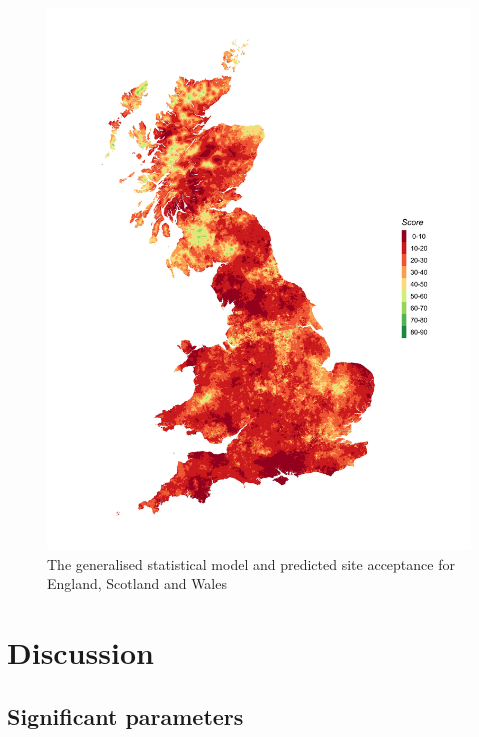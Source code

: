 \documentclass[a4paper,]{article}
\theoremstyle{definition}
\theoremstyle{definition}
\theoremstyle{definition}
\theoremstyle{remark}
\begin{document}
\begin{figure}[h]

{\centering \includegraphics[width=1\linewidth]{figures/figure8} 

}

\caption{The generalised statistical model and predicted site acceptance for England, Scotland and Wales}\label{fig:predictionRaster}
\end{figure}

\hypertarget{discussion}{%
\section{Discussion}\label{discussion}}

\hypertarget{significant-parameters}{%
\subsection{Significant parameters}\label{significant-parameters}}
\end{document}
